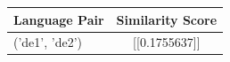 \begin{tabular}{|l|c|}
\hline
Language Pair & Similarity Score \\
\hline
('de1', 'de2') & [[0.1755637]] \\
\hline
\end{tabular}

